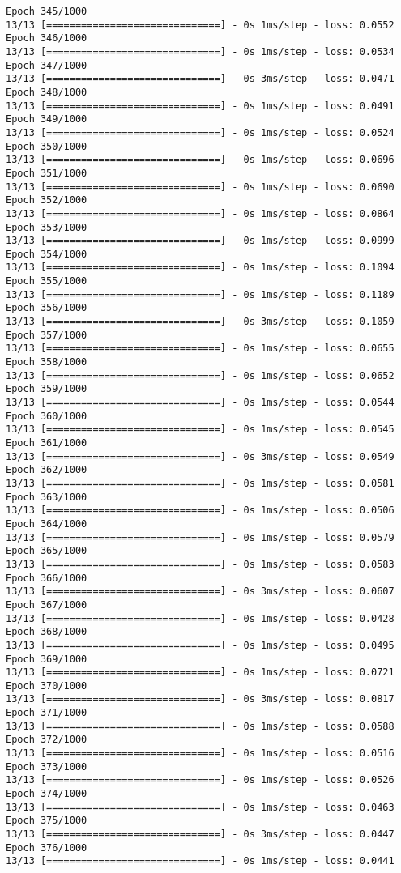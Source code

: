 \documentclass[11pt]{article}
\begin{document}
\begin{Verbatim}[commandchars=\\\{\}]
Epoch 345/1000
13/13 [==============================] - 0s 1ms/step - loss: 0.0552
Epoch 346/1000
13/13 [==============================] - 0s 1ms/step - loss: 0.0534
Epoch 347/1000
13/13 [==============================] - 0s 3ms/step - loss: 0.0471
Epoch 348/1000
13/13 [==============================] - 0s 1ms/step - loss: 0.0491
Epoch 349/1000
13/13 [==============================] - 0s 1ms/step - loss: 0.0524
Epoch 350/1000
13/13 [==============================] - 0s 1ms/step - loss: 0.0696
Epoch 351/1000
13/13 [==============================] - 0s 1ms/step - loss: 0.0690
Epoch 352/1000
13/13 [==============================] - 0s 1ms/step - loss: 0.0864
Epoch 353/1000
13/13 [==============================] - 0s 1ms/step - loss: 0.0999
Epoch 354/1000
13/13 [==============================] - 0s 1ms/step - loss: 0.1094
Epoch 355/1000
13/13 [==============================] - 0s 1ms/step - loss: 0.1189
Epoch 356/1000
13/13 [==============================] - 0s 3ms/step - loss: 0.1059
Epoch 357/1000
13/13 [==============================] - 0s 1ms/step - loss: 0.0655
Epoch 358/1000
13/13 [==============================] - 0s 1ms/step - loss: 0.0652
Epoch 359/1000
13/13 [==============================] - 0s 1ms/step - loss: 0.0544
Epoch 360/1000
13/13 [==============================] - 0s 1ms/step - loss: 0.0545
Epoch 361/1000
13/13 [==============================] - 0s 3ms/step - loss: 0.0549
Epoch 362/1000
13/13 [==============================] - 0s 1ms/step - loss: 0.0581
Epoch 363/1000
13/13 [==============================] - 0s 1ms/step - loss: 0.0506
Epoch 364/1000
13/13 [==============================] - 0s 1ms/step - loss: 0.0579
Epoch 365/1000
13/13 [==============================] - 0s 1ms/step - loss: 0.0583
Epoch 366/1000
13/13 [==============================] - 0s 3ms/step - loss: 0.0607
Epoch 367/1000
13/13 [==============================] - 0s 1ms/step - loss: 0.0428
Epoch 368/1000
13/13 [==============================] - 0s 1ms/step - loss: 0.0495
Epoch 369/1000
13/13 [==============================] - 0s 1ms/step - loss: 0.0721
Epoch 370/1000
13/13 [==============================] - 0s 3ms/step - loss: 0.0817
Epoch 371/1000
13/13 [==============================] - 0s 1ms/step - loss: 0.0588
Epoch 372/1000
13/13 [==============================] - 0s 1ms/step - loss: 0.0516
Epoch 373/1000
13/13 [==============================] - 0s 1ms/step - loss: 0.0526
Epoch 374/1000
13/13 [==============================] - 0s 1ms/step - loss: 0.0463
Epoch 375/1000
13/13 [==============================] - 0s 3ms/step - loss: 0.0447
Epoch 376/1000
13/13 [==============================] - 0s 1ms/step - loss: 0.0441

\end{Verbatim}
\end{document}
